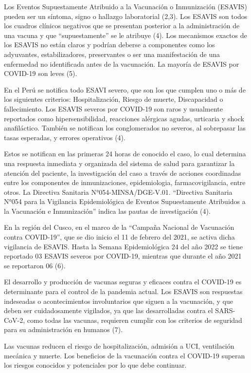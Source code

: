 \documentclass[12pt,a4paper,openany]{book}
\begin{document}
Los Eventos Supuestamente Atribuido a la Vacunación o Inmunización (ESAVIS) pueden ser un síntoma, signo o hallazgo laboratorial (2,3). Los ESAVIS son todos los cuadros clínicos negativos que se presentan posterior a la administración de una vacuna y que “supuestamente” se le atribuye (4). Los mecanismos exactos de los ESAVIS no están claros y podrían deberse a componentes como los adyuvantes, estabilizadores, preservantes o ser una manifestación de una enfermedad no identificada antes de la vacunación. La mayoría de ESAVIS por COVID-19 son leves (5). 


En el Perú se notifica todo ESAVI severo, que son los que cumplen uno o más de los siguientes criterios: Hospitalización, Riesgo de muerte, Discapacidad o fallecimiento. Los ESAVIS severos por COVID-19 son raros y usualmente reportados como hipersensibilidad, reacciones alérgicas agudas, urticaria y shock anafiláctico. También se notifican los conglomerados no severos, al sobrepasar las tasas esperadas, y errores operativos (4). 


Estos se notifican en las primeras 24 horas de conocido el caso, lo cual determina una respuesta inmediata y organizada del sistema de salud para garantizar la atención del paciente, la investigación del caso a través de acciones coordinadas entre los componentes de inmunizaciones, epidemiologia, farmacovigilancia, entre otros. La Directiva Sanitaria N°054-MINSA/DGE-V.01. “Directiva Sanitaria N°054 para la Vigilancia Epidemiológica de Eventos Supuestamente Atribuidos a la Vacunación e Inmunización” indica las pautas de investigación (4).


En la región del Cusco, en el marco de la “Campaña Nacional de Vacunación contra COVID-19”, que se dio inicio el 11 de febrero del 2021, se activa dicha vigilancia de ESAVIS. Hasta la Semana Epidemiológica 24 del año 2022 se tiene reportado 03 ESAVIS severos por COVID-19, mientras que durante el año 2021 se reportaron 06 (6). 


El desarrollo y producción de vacunas seguras y eficaces contra el COVID-19 es determinante para el control de la pandemia actual. Los ESAVIS son respuestas indeseadas o acontecimientos involuntarios que siguen a la vacunación, y que deben ser cuidadosamente vigilados, ya que las desarrolladas contra el SARS-CoV-2, como todas las vacunas, requieren cumplir con los criterios de seguridad para su administración en humanos (7).


Las vacunas reducen el riesgo de hospitalización, admisión a UCI, ventilación mecánica y muerte. Los beneficios de la vacunación contra el COVID-19 superan los riesgos conocidos y potenciales por lo que debe continuar.
\end{document}
